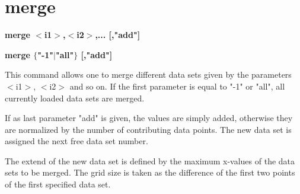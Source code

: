 \section{merge}
{\bf merge $ <$i1$> $,$ <$i2$> $,... [,"add"] \par }
{\bf merge $ \{$"-1"$| $"all"$\} $  [,"add"] \par }
\par
\vspace{3pt}
This command allows one to merge different data sets given by 
the parameters $ <$i1$> $, $ <$i2$> $ and so on. 
If the first parameter is equal to "-1" or "all", all currently 
loaded data sets are merged. 
\par
If as last parameter "add" 
is given, the values are simply added, otherwise they are 
normalized by the number of contributing data points. The new 
data set is assigned the next free data set number. 
\par
The extend of the new data set is defined by the maximum x-values 
of the data sets to be merged. The grid size is taken as the 
difference of the first two points of the first specified data set. 
